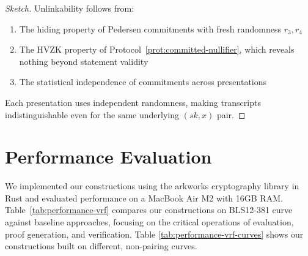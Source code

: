 \begin{proof}[Sketch]
Unlinkability follows from:
\begin{enumerate}
    \item The hiding property of Pedersen commitments with fresh randomness $r_3, r_4$
    \item The HVZK property of Protocol~\ref{prot:committed-nullifier}, which reveals nothing beyond statement validity
    \item The statistical independence of commitments across presentations
\end{enumerate}
Each presentation uses independent randomness, making transcripts indistinguishable even for the same underlying $(sk, x)$ pair.
\end{proof}




















\section{Performance Evaluation}\label{sec:performance-vrf}

We implemented our constructions \cite{polgar_anonymous_2025} using the arkworks cryptography library \cite{arkworks_contributors_arkworks_2022} in Rust and evaluated performance on a MacBook Air M2 with 16GB RAM. Table~\ref{tab:performance-vrf} compares our constructions on BLS12-381 curve against baseline approaches, focusing on the critical operations of evaluation, proof generation, and verification. Table \ref{tab:performance-vrf-curves} shows our constructions built on different, non-pairing curves.

